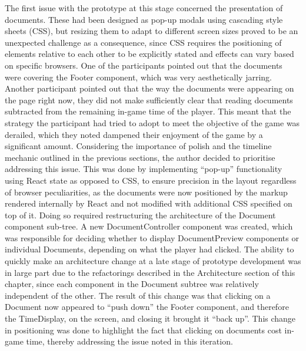 \documentclass{l4proj}
\begin{document}
The first issue with the prototype at this stage concerned the presentation of documents. These had been designed as pop-up modals using cascading style sheets (CSS), but resizing them to adapt to different screen sizes proved to be an unexpected challenge as a consequence, since CSS requires the positioning of elements relative to each other to be explicitly stated and effects can vary based on specific browsers. One of the participants pointed out that the documents were covering the Footer component, which was very aesthetically jarring. Another participant pointed out that the way the documents were appearing on the page right now, they did not make sufficiently clear that reading documents subtracted from the remaining in-game time of the player. This meant that the strategy the participant had tried to adopt to meet the objective of the game was derailed, which they noted dampened their enjoyment of the game by a significant amount. Considering the importance of polish and the timeline mechanic outlined in the previous sections, the author decided to prioritise addressing this issue. This was done by implementing “pop-up” functionality using React state as opposed to CSS, to ensure precision in the layout regardless of browser peculiarities, as the documents were now positioned by the markup rendered internally by React and not modified with additional CSS specified on top of it. Doing so required restructuring the architecture of the Document component sub-tree. A new DocumentController component was created, which was responsible for deciding whether to display DocumentPreview components or individual Documents, depending on what the player had clicked. The ability to quickly make an architecture change at a late stage of prototype development was in large part due to the refactorings described in the Architecture section of this chapter, since each component in the Document subtree was relatively independent of the other. The result of this change was that clicking on a Document now appeared to “push down” the Footer component, and therefore the TimeDisplay, on the screen, and closing it brought it “back up”. This change in positioning was done to highlight the fact that clicking on documents cost in-game time, thereby addressing the issue noted in this iteration. 
\end{document}

